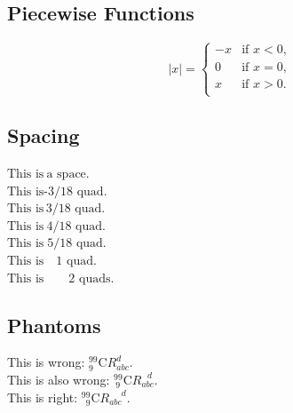 \documentclass{article}
\begin{document}
    \subsection{Piecewise Functions}
    \begin{equation*}
        |x| = 
        \begin{cases}
            -x & \text{if } x < 0, \\
             0 & \text{if } x = 0, \\
             x & \text{if } x > 0. \\
        \end{cases}
    \end{equation*}
    \subsection{Spacing}
    $ \text{This is} \  \text{a space.} $ \\
    $ \text{This is} \! \text{-3/18 quad.} $ \\
    $ \text{This is} \, \text{3/18 quad.} $ \\
    $ \text{This is} \: \text{4/18 quad.} $ \\
    $ \text{This is} \; \text{5/18 quad.} $ \\
    $ \text{This is} \quad \text{1 quad.} $ \\
    $ \text{This is} \qquad \text{2 quads.} $
    \subsection{Phantoms}
    This is wrong: ${}^{99}_{ 9}\text{C}R_{abc}^{   d}$.\\
    This is also wrong: ${}^{99}_{\ 9}\text{C}R_{abc}^{\ \ \ d}$.\\
    This is right: ${}^{99}_{\phantom{9}9}\text{C}R_{abc}^{\phantom{abc}d}$.
\end{document}
